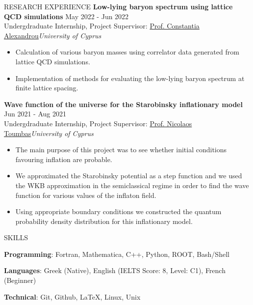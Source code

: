 \documentclass{resume} %
\begin{document}
\begin{rSection}{RESEARCH EXPERIENCE}
\textbf{Low-lying baryon spectrum using lattice QCD simulations} \hfill May 2022 - Jun 2022\\
Undergdraduate Internship, Project Supervisor:  \href{https://www.cyi.ac.cy/index.php/castorc/about-the-center/castorc-our-people/itemlist/user/99-constantia-alexandrou.html}{Prof. Constantia Alexandrou}\hfill \textit{University of Cyprus}
\begin{itemize}
\itemsep -3pt {} 
\item Calculation of various baryon masses using correlator data generated from lattice QCD simulations.
\item Implementation of methods for evaluating the low-lying baryon spectrum at finite lattice spacing.
\end{itemize}

\textbf{Wave function of the universe for the Starobinsky inflationary model} \hfill Jun 2021 - Aug 2021\\
Undergdraduate Internship, Project Supervisor:  \href{https://www.ucy.ac.cy/directory/en/profile/nick}{Prof. Nicolaos Toumbas}\hfill \textit{University of Cyprus}
\begin{itemize}
\itemsep -3pt {} 
\item The main purpose of this project was to see whether initial conditions favouring inflation are probable.
\item We approximated the Starobinsky potential as a step function and we used the WKB approximation in the semiclassical regime in order to find the wave function for various values of the inflaton field.
\item Using appropriate boundary conditions we constructed the quantum probability density distribution for this inflationary model.
\end{itemize}
\end{rSection} 

\bigbreak



\begin{rSection}{SKILLS}
\itemsep -3pt {} 
\item \textbf{Programming}: Fortran, Mathematica, C++, Python, ROOT, Bash/Shell
\item \textbf{Languages}: Greek (Native), English (IELTS Score: 8, Level: C1), French (Beginner)
\item \textbf{Technical}: Git, Github, \LaTeX, Linux, Unix
\end{rSection}

\bigbreak
\end{document}
